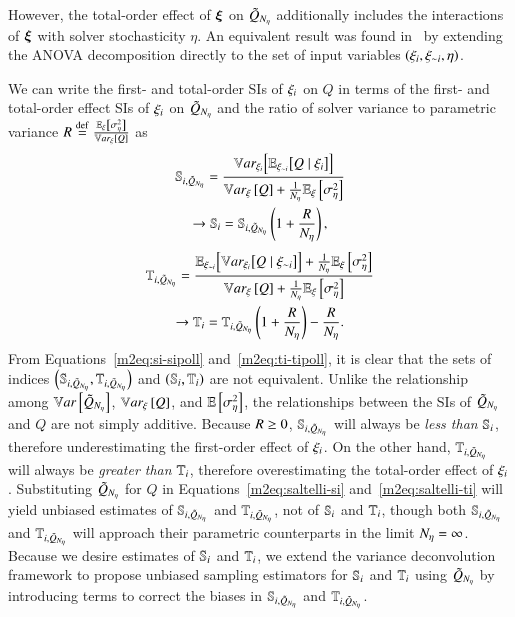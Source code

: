 However, the total-order effect of $\bxi$ on $\Qpoll$ additionally includes the interactions of $\bxi$ with solver stochasticity $\eta$. 
An equivalent result was found in~\cite{marrel-etal-2012} by extending the ANOVA decomposition directly to the set of input variables $\left( \xii, \xini, \eta \right)$.

We can write the first- and total-order SIs of $\xii$ on $Q$ in terms of the first- and total-order effect SIs of $\xii$ on $\Qpoll$ and the ratio of solver variance to parametric variance $\tempsymbol \defin \frac{\EExi{\Sigsqeta}}{\Vxi{Q}}$ as
\begin{gather} \nonumber
    \Spoll{i} = \frac{\VEi{Q \mid \xii}}{\Vxi{Q} + \frac{1}{\Neta}\EExi{\Sigsqeta}} \\ \label{m2eq:si-sipoll}
    \rightarrow \S{i} = \Spoll{i} \left( 1 + \frac{\tempsymbol}{\Neta} \right) ,
\end{gather}
\begin{gather} \nonumber
    \Tpoll{i} = \frac{\EVni{Q \mid \xini} + \frac{1}{\Neta}\EExi{\Sigsqeta}}{\Vxi{Q} + \frac{1}{\Neta}\EExi{\Sigsqeta}} \\ \label{m2eq:ti-tipoll}
    \rightarrow \T{i} = \Tpoll{i}\left( 1 + \frac{\tempsymbol}{\Neta} \right) - \frac{\tempsymbol}{\Neta} .
\end{gather}
%
From Equations~\eqref{m2eq:si-sipoll} and~\eqref{m2eq:ti-tipoll}, it is clear that the sets of indices $\left(\Spoll{i}, \Tpoll{i} \right)$ and $\left(\S{i}, \T{i}\right)$ are not equivalent. 
Unlike the relationship among $\Var{\Qpoll}$, $\Vxi{Q}$, and $\EE{\Sigsqeta}$, the relationships between the SIs of $\Qpoll$ and $Q$ are not simply additive.
Because $\tempsymbol \geq 0$, $\Spoll{i}$ will always be \emph{less than} $\S{i}$, therefore underestimating the first-order effect of $\xii$.
On the other hand, $\Tpoll{i}$ will always be \emph{greater than} $\T{i}$, therefore overestimating the total-order effect of $\xii$. 
%
Substituting $\Qpoll$ for $Q$ in Equations~\eqref{m2eq:saltelli-si} and~\eqref{m2eq:saltelli-ti} will yield unbiased estimates of $\Spoll{i}$ and $\Tpoll{i}$, not of $\S{i}$ and $\T{i}$, though both $\Spoll{i}$ and $\Tpoll{i}$ will approach their parametric counterparts in the limit $\Neta=\infty$.
Because we desire estimates of $\S{i}$ and $\T{i}$, we extend the variance deconvolution framework to propose unbiased sampling estimators for $\S{i}$ and $\T{i}$ using $\Qpoll$ by introducing terms to correct the biases in $\Spoll{i}$ and $\Tpoll{i}$. 


